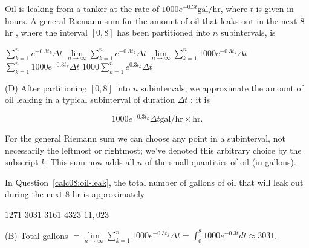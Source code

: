\question\label{calc08:oil-leak}
Oil is leaking from a tanker at the rate of $1000 e^{-0.3 t} \mathrm{gal} / \mathrm{hr}$, where $t$ is given in hours. A general Riemann sum for the amount of oil that leaks out in the next 8 hr , where the interval $[0,8]$ has been partitioned into $n$ subintervals, is
\begin{choices}
  \choice $\sum_{k=1}^{n} e^{-0.3 t_{k}} \Delta t$
  \choice $\lim\limits_{n \to \infty} \sum_{k=1}^{n} e^{-0.3 t_{k}} \Delta t$
  \choice $\lim\limits_{n \to \infty} \sum_{k=1}^{n} 1000 e^{-0.3 t_{k}} \Delta t$
  \CorrectChoice $\sum_{k=1}^{n} 1000 e^{-0.3 t_{k}} \Delta t$
  \choice $1000 \sum_{k=1}^{n} e^{0.3 t_{k}} \Delta t$
\end{choices}
\begin{solution}
(D) After partitioning $[0,8]$ into $n$ subintervals, we approximate the amount of oil leaking in a typical subinterval of duration $\Delta t$ : it is

\[
1000 e^{-0.3 t_{k}} \Delta t \mathrm{gal} / \mathrm{hr} \times \mathrm{hr} .
\]

For the general Riemann sum we can choose any point in a subinterval, not necessarily the leftmost or rightmost; we've denoted this arbitrary choice by the subscript $k$. This sum now adds all $n$ of the small quantities of oil (in gallons).
\end{solution}

\question
In Question~\ref{calc08:oil-leak}, the total number of gallons of oil that will leak out during the next 8 hr is approximately
\begin{choices}
  \choice $1271$
  \CorrectChoice $3031$
  \choice $3161$
  \choice $4323$
  \choice $11{,}023$
\end{choices}
\begin{solution}
(B) Total gallons $=\lim\limits_{n \to \infty} \sum_{k=1}^{n} 1000 e^{-0.3 t_{k}} \Delta t=\int_{0}^{8} 1000 e^{-0.3 t} d t \approx 3031$.
\end{solution}



\newpage



